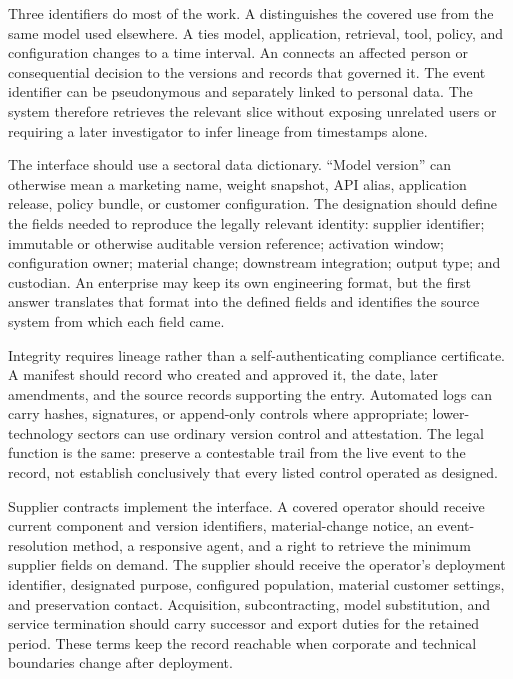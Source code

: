 Three identifiers do most of the work. A  distinguishes the covered use from the same model used elsewhere. A  ties model, application, retrieval, tool, policy, and configuration changes to a time interval. An  connects an affected person or consequential decision to the versions and records that governed it. The event identifier can be pseudonymous and separately linked to personal data. The system therefore retrieves the relevant slice without exposing unrelated users or requiring a later investigator to infer lineage from timestamps alone.

The interface should use a sectoral data dictionary. ``Model version'' can otherwise mean a marketing name, weight snapshot, API alias, application release, policy bundle, or customer configuration. The designation should define the fields needed to reproduce the legally relevant identity: supplier identifier; immutable or otherwise auditable version reference; activation window; configuration owner; material change; downstream integration; output type; and custodian. An enterprise may keep its own engineering format, but the first answer translates that format into the defined fields and identifies the source system from which each field came.

Integrity requires lineage rather than a self-authenticating compliance certificate. A manifest should record who created and approved it, the date, later amendments, and the source records supporting the entry. Automated logs can carry hashes, signatures, or append-only controls where appropriate; lower-technology sectors can use ordinary version control and attestation. The legal function is the same: preserve a contestable trail from the live event to the record, not establish conclusively that every listed control operated as designed.

Supplier contracts implement the interface. A covered operator should receive current component and version identifiers, material-change notice, an event-resolution method, a responsive agent, and a right to retrieve the minimum supplier fields on demand. The supplier should receive the operator's deployment identifier, designated purpose, configured population, material customer settings, and preservation contact. Acquisition, subcontracting, model substitution, and service termination should carry successor and export duties for the retained period. These terms keep the record reachable when corporate and technical boundaries change after deployment.

